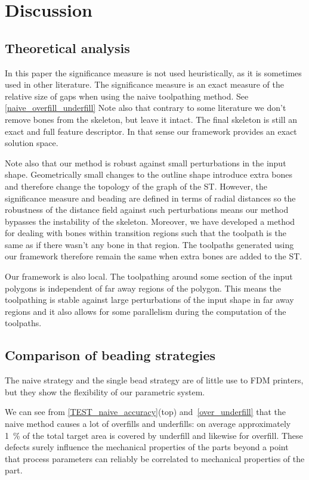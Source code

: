 \section{Discussion}

\subsection{Theoretical analysis}
In this paper the significance measure is not used heuristically, as it is sometimes used in other literature.
The significance measure is an exact measure of the relative size of gaps when using the naive toolpathing method.
See \cref{naive_overfill_underfill}
Note also that contrary to some literature we don't remove bones from the skeleton, but leave it intact.
The final skeleton is still an exact and full feature descriptor.
In that sense our framework provides an exact solution space.

Note also that our method is robust against small perturbations in the input shape.
Geometrically small changes to the outline shape introduce extra bones and therefore change the topology of the graph of the ST.
However, the significance measure and beading are defined in terms of radial distances so the robustness of the distance field against such perturbations means our method bypasses the instability of the skeleton.
Moreover, we have developed a method for dealing with bones within transition regions such that the toolpath is the same as if there wasn't any bone in that region.
The toolpaths generated using our framework therefore remain the same when extra bones are added to the ST.

Our framework is also local.
The toolpathing around some section of the input polygons is independent of far away regions of the polygon.
This means the toolpathing is stable against large perturbations of the input shape in far away regions
and it also allows for some parallelism during the computation of the toolpaths.



\subsection{Comparison of beading strategies}
The naive strategy and the single bead strategy are of little use to FDM printers, but they show the flexibility of our parametric system.

We can see from \cref{TEST_naive_accuracy}(top) and~\ref{over_underfill} that the naive method causes a lot of overfills and underfills: on average approximately \SI{1}{\percent} of the total target area is covered by underfill and likewise for overfill.
These defects surely influence the mechanical properties of the parts beyond a point that process parameters can reliably be correlated to mechanical properties of the part.

